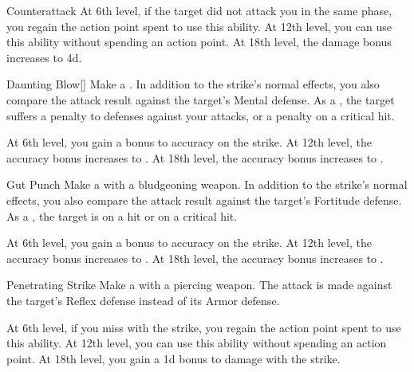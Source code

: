 {\begin{ability}{Counterattack}
                At 6th level, if the target did not attack you in the same phase, you regain the action point spent to use this ability.
                At 12th level, you can use this ability without spending an action point.
                At 18th level, the damage bonus increases to \plus4d.
            \end{ability}

            \begin{ability}{Daunting Blow}[]
                Make a .
                In addition to the strike's normal effects, you also compare the attack result against the target's Mental defense.
                As a , the target suffers a  penalty to defenses against your attacks, or a  penalty on a critical hit.

                At 6th level, you gain a  bonus to accuracy on the strike.
                At 12th level, the accuracy bonus increases to .
                At 18th level, the accuracy bonus increases to .
            \end{ability}

            \begin{ability}{Gut Punch}
                Make a  with a bludgeoning weapon.
                In addition to the strike's normal effects, you also compare the attack result against the target's Fortitude defense.
                As a , the target is \sickened on a hit or \nauseated on a critical hit.

                At 6th level, you gain a  bonus to accuracy on the strike.
                At 12th level, the accuracy bonus increases to .
                At 18th level, the accuracy bonus increases to .
            \end{ability}

            \begin{ability}{Penetrating Strike}
                Make a  with a piercing weapon.
                The attack is made against the target's Reflex defense instead of its Armor defense.

                At 6th level, if you miss with the strike, you regain the action point spent to use this ability.
                At 12th level, you can use this ability without spending an action point.
                At 18th level, you gain a \plus1d bonus to damage with the strike.
            \end{ability}

}
